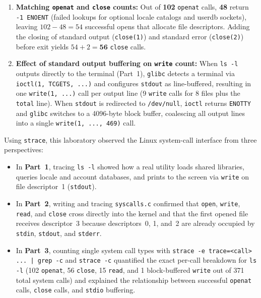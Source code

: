 \documentclass{../latex/utmreport}
\providecommand{\tightlist}{\setlength{\itemsep}{0pt}\setlength{\parskip}{0pt}}
\begin{document}
\begin{enumerate}
\tightlist
\item \textbf{Matching \texttt{openat} and \texttt{close} counts:}
Out of \textbf{102} \texttt{openat} calls, \textbf{48} return \texttt{-1 ENOENT} (failed lookups for optional locale catalogs and userdb sockets), leaving $102 - 48 = 54$ successful opens that allocate file descriptors. Adding the closing of standard output (\texttt{close(1)}) and standard error (\texttt{close(2)}) before exit yields $54 + 2 = \mathbf{56}$ \texttt{close} calls.
\item \textbf{Effect of standard output buffering on \texttt{write} count:}
When \texttt{ls -l} outputs directly to the terminal (Part~1), \texttt{glibc} detects a terminal via \texttt{ioctl(1, TCGETS, ...)} and configures \texttt{stdout} as line-buffered, resulting in one \texttt{write(1, ...)} call per output line (9 \texttt{write} calls for 8 files plus the \texttt{total} line). When \texttt{stdout} is redirected to \texttt{/dev/null}, \texttt{ioctl} returns \texttt{ENOTTY} and \texttt{glibc} switches to a 4096-byte block buffer, coalescing all output lines into a single \texttt{write(1, ..., 469)} call.
\end{enumerate}

\utmconclusions

Using \texttt{strace}, this laboratory observed the Linux system-call interface from three perspectives:
\begin{itemize}
\tightlist
\item In \textbf{Part~1}, tracing \texttt{ls -l} showed how a real utility loads shared libraries, queries locale and account databases, and prints to the screen via \texttt{write} on file descriptor~1 (\texttt{stdout}).
\item In \textbf{Part~2}, writing and tracing \texttt{syscalls.c} confirmed that \texttt{open}, \texttt{write}, \texttt{read}, and \texttt{close} cross directly into the kernel and that the first opened file receives descriptor~3 because descriptors~0, 1, and~2 are already occupied by \texttt{stdin}, \texttt{stdout}, and \texttt{stderr}.
\item In \textbf{Part~3}, counting single system call types with \texttt{strace -e trace=<call> ... | grep -c} and \texttt{strace -c} quantified the exact per-call breakdown for \texttt{ls -l} (102 \texttt{openat}, 56 \texttt{close}, 15 \texttt{read}, and 1 block-buffered \texttt{write} out of 371 total system calls) and explained the relationship between successful \texttt{openat} calls, \texttt{close} calls, and \texttt{stdio} buffering.
\end{itemize}
\end{document}

